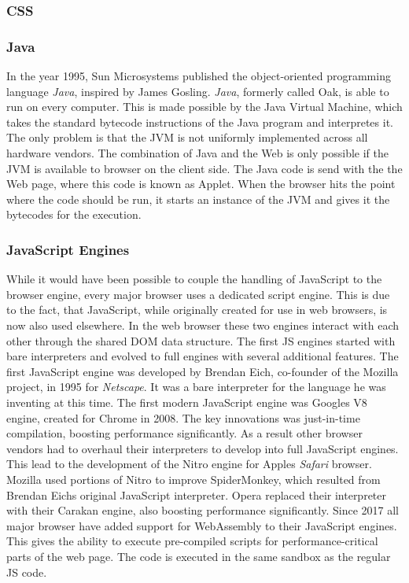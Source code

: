 \documentclass[runningheads]{llncs}
\begin{document}
			\subsubsection{CSS}%
			\subsubsection{Java}
			\leavevmode\newline
			In the year 1995, Sun Microsystems published the object-oriented programming language \textit{Java}, inspired by James Gosling. \textit{Java}, formerly called Oak, is able to run on every computer. This is made possible by the Java Virtual Machine, which takes the standard bytecode instructions of the Java program and interpretes it. The only problem is that the JVM is not uniformly implemented across all hardware vendors. The combination of Java and the Web is only possible if the JVM is available to browser on the client side. The Java code is send with the the Web page, where this code is known as Applet. When the browser hits the point where the code should be run, it starts an instance of the JVM and gives it the bytecodes for the execution.
			\subsubsection{JavaScript Engines} \leavevmode\newline
			While it would have been possible to couple the handling of JavaScript to the browser engine, every major browser uses a dedicated script engine. This is due to the fact, that JavaScript, while originally created for use in web browsers, is now also used elsewhere. In the web browser these two engines interact with each other through the shared DOM data structure.
			The first JS engines started with bare interpreters and evolved to full engines with several additional features. The first JavaScript engine was developed by Brendan Eich, co-founder of the Mozilla project, in 1995 for \textit{Netscape}. It was a bare interpreter for the language he was inventing at this time. The first modern JavaScript engine was Googles V8 engine, created for Chrome in 2008. The key innovations was just-in-time compilation, boosting performance significantly. As a result other browser vendors had to overhaul their interpreters to develop into full JavaScript engines. This lead to the development of the Nitro engine for Apples \textit{Safari} browser. Mozilla used portions of Nitro to improve SpiderMonkey, which resulted from Brendan Eichs original JavaScript interpreter. Opera replaced their interpreter with their Carakan engine, also boosting performance significantly.
			Since 2017 all major browser have added support for WebAssembly to their JavaScript engines. This gives the ability to execute pre-compiled scripts for performance-critical parts of the web page. The code is executed in the same sandbox as the regular JS code.
\end{document}
